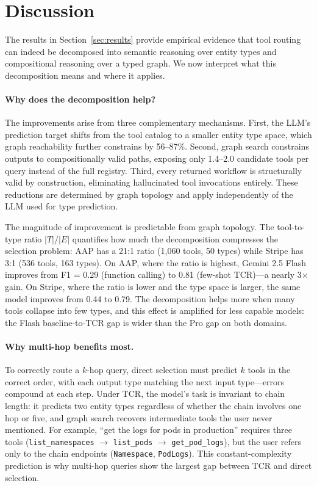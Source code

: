 
\section{Discussion}
\label{sec:discussion}

The results in Section~\ref{sec:results} provide empirical evidence that tool routing can indeed be decomposed into semantic reasoning over entity types and compositional reasoning over a typed graph.
We now interpret what this decomposition means and where it applies.

\paragraph{Why does the decomposition help?}

The improvements arise from three complementary mechanisms.
First, the LLM's prediction target shifts from the tool catalog to a smaller entity type space, which graph reachability further constrains by 56--87\%.
Second, graph search constrains outputs to compositionally valid paths, exposing only 1.4--2.0 candidate tools per query instead of the full registry.
Third, every returned workflow is structurally valid by construction, eliminating hallucinated tool invocations entirely.
These reductions are determined by graph topology and apply independently of the LLM used for type prediction.

The magnitude of improvement is predictable from graph topology.
The tool-to-type ratio $|T|/|E|$ quantifies how much the decomposition compresses the selection problem: AAP has a 21:1 ratio (1,060 tools, 50 types) while Stripe has 3:1 (536 tools, 163 types).
On AAP, where the ratio is highest, Gemini 2.5 Flash improves from F1 = 0.29 (function calling) to 0.81 (few-shot TCR)---a nearly 3$\times$ gain.
On Stripe, where the ratio is lower and the type space is larger, the same model improves from 0.44 to 0.79.
The decomposition helps more when many tools collapse into few types, and this effect is amplified for less capable models: the Flash baseline-to-TCR gap is wider than the Pro gap on both domains.

\paragraph{Why multi-hop benefits most.}

To correctly route a $k$-hop query, direct selection must predict $k$ tools in the correct order, with each output type matching the next input type---errors compound at each step.
Under TCR, the model's task is invariant to chain length: it predicts two entity types regardless of whether the chain involves one hop or five, and graph search recovers intermediate tools the user never mentioned.
For example, ``get the logs for pods in production'' requires three tools (\texttt{list\_namespaces} $\rightarrow$ \texttt{list\_pods} $\rightarrow$ \texttt{get\_pod\_logs}), but the user refers only to the chain endpoints (\texttt{Namespace}, \texttt{PodLogs}).
This constant-complexity prediction is why multi-hop queries show the largest gap between TCR and direct selection.

